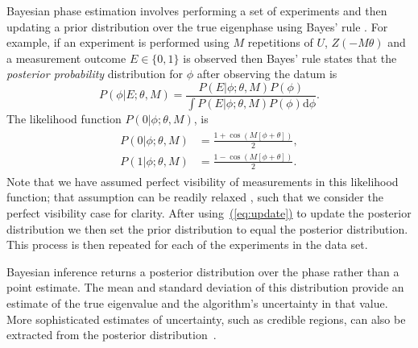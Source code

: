 \documentclass[aps,prl,amsmath,twocolumn,amssymb,superscriptaddress]{revtex4-1}
\newcommand{\eq}[1]{\hyperref[eq:#1]{(\ref*{eq:#1})}}
\begin{document}
Bayesian phase estimation involves performing a 
set of experiments and then updating a prior distribution over the true eigenphase using Bayes' rule
\cite{berry_optimal_2000,berry_optimal_2001,SHF14}.
For example, if an experiment is performed using $M$ repetitions of $U$,
$Z(-M \theta)$ and a measurement outcome $E\in \{0,1\}$ is observed then Bayes'
rule states that the \emph{posterior probability} distribution for $\phi$
after observing the datum is
\begin{equation}
P(\phi|E;\theta,M) = \frac{P(E|\phi;\theta,M)P(\phi)}{\int P(E|\phi;\theta,M)P(\phi)\mathrm{d}{\phi}}.\label{eq:update}
\end{equation}
The likelihood
function  $P(0|\phi;\theta,M)$,  is
\begin{gather}
    \label{eq:likenodecohere}
    \begin{aligned}
        P(0|\phi;\theta,M) & = \frac{1+\cos(M[\phi +\theta])}{2},\\
        P(1|\phi;\theta,M) & = \frac{1-\cos(M[\phi +\theta])}{2}.
    \end{aligned}
\end{gather}
Note that we have assumed perfect visibility of measurements in this likelihood function;
that assumption can be readily relaxed \cite{ferrie_how_2013,cappellaro_spin_2012}, such that
we consider the perfect visibility case for clarity.
After using~\eq{update} to update the posterior distribution we then set the prior distribution to equal the posterior distribution.  This process is then repeated for each of the experiments in the data set.

Bayesian inference returns a posterior
distribution over the phase rather than a point estimate. The mean and standard deviation of this
distribution provide an estimate of the true eigenvalue and the algorithm's
uncertainty in that value. More sophisticated estimates of uncertainty, such
as credible regions, can also be extracted from the posterior
distribution~\cite{granade_robust_2012,ferrie_high_2014}.  

\end{document}

